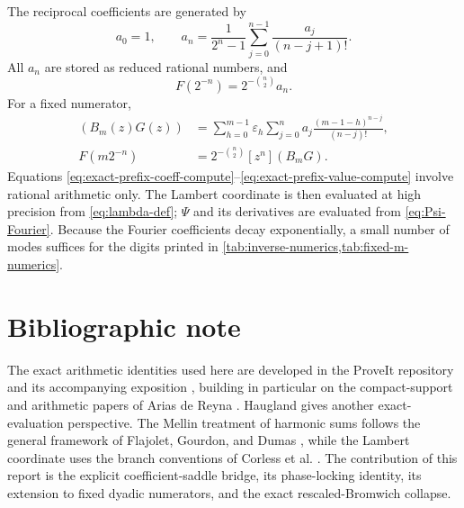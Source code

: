 \documentclass[11pt,oneside]{article}
\theoremstyle{definition}
\theoremstyle{remark}
\newcommand{\TM}{\varepsilon}
\begin{document}
The reciprocal coefficients are generated by
\begin{equation}
 a_0=1,
 \qquad
 a_n=\frac1{2^n-1}
 \sum_{j=0}^{n-1}\frac{a_j}{(n-j+1)!}.
\end{equation}
All $a_n$ are stored as reduced rational numbers, and
\begin{equation}
 F(2^{-n})=2^{-\binom n2}a_n.
\end{equation}
For a fixed numerator,
\begin{align}
 [z^n](B_m(z)G(z))
 &=\sum_{h=0}^{m-1}\TM_h
 \sum_{j=0}^{n}a_j
 \frac{(m-1-h)^{n-j}}{(n-j)!},                             \label{eq:exact-prefix-coeff-compute}\\
 F(m2^{-n})
 &=2^{-\binom n2}[z^n](B_mG).                              \label{eq:exact-prefix-value-compute}
\end{align}
Equations \eqref{eq:exact-prefix-coeff-compute}--\eqref{eq:exact-prefix-value-compute} involve rational arithmetic only.  The Lambert coordinate is then evaluated at high precision from
\eqref{eq:lambda-def}; $\Psi$ and its derivatives are evaluated from
\eqref{eq:Psi-Fourier}.  Because the Fourier coefficients decay exponentially, a small number of modes suffices for the digits printed in \cref{tab:inverse-numerics,tab:fixed-m-numerics}.

\section{Bibliographic note}

The exact arithmetic identities used here are developed in the ProveIt repository and its accompanying exposition \cite{proveit,masterdoc}, building in particular on the compact-support and arithmetic papers of Arias de Reyna \cite{arias1982,arias2018}.  Haugland \cite{haugland2016} gives another exact-evaluation perspective.  The Mellin treatment of harmonic sums follows the general framework of Flajolet, Gourdon, and Dumas \cite{flajolet1995}, while the Lambert coordinate uses the branch conventions of Corless et al. \cite{corless1996}.  The contribution of this report is the explicit coefficient-saddle bridge, its phase-locking identity, its extension to fixed dyadic numerators, and the exact rescaled-Bromwich collapse.
\end{document}

